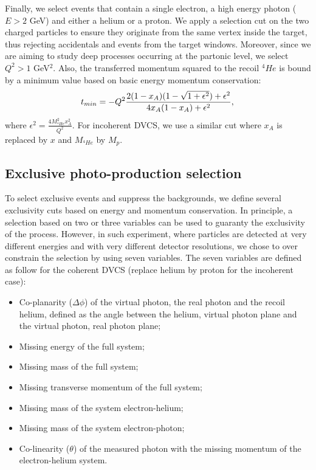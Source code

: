 \documentclass[aps,prc,preprint,superscriptaddress]{revtex4}
\begin{document}
Finally, we select events that contain a single electron, a high energy photon ($E>2$ GeV) and
either a helium or a proton. We apply a selection cut on the two charged particles 
to ensure they originate from the same vertex inside the target, thus rejecting accidentals and
events from the target windows.
Moreover, since we are aiming to study deep processes occurring at the partonic level, we select
$Q^2>1$ GeV$^2$. Also, the transferred momentum squared to the recoil $^{4}He$ is bound by
   a minimum value based on basic energy momentum conservation:
\begin{equation}
   t_{min} = - Q^{2} \frac{2(1- x_{A})(1 - \sqrt{1 + \epsilon ^{2}}) + \epsilon 
   ^{2}}{4 x_{A}(1-x_{A})+ \epsilon ^{2}},\\
\end{equation}
where $\epsilon ^{2} = \frac{4M^{2}_{^4\!He}x^{2}_{A}}{Q^{2}}$. For incoherent DVCS, 
we use a similar cut where $x_A$ is replaced by $x$ and $M_{^4\!He}$ by $M_{p}$. 

\subsection{Exclusive photo-production selection}

To select exclusive events and suppress the backgrounds, we define several 
exclusivity cuts based on energy and momentum conservation. In principle, 
a selection based on two or three variables can be used to guaranty the 
exclusivity of the process. However, in such experiment, where particles 
are detected at very different energies and with very different detector 
resolutions, we chose to over constrain the selection by using seven 
variables. The seven variables are defined as follow for the coherent 
DVCS (replace helium by proton for the incoherent case):
\begin{itemize}
	\item Co-planarity ($\Delta \phi$) of the virtual photon, the real photon and
		the recoil helium, defined as the angle between the helium, virtual photon
		plane and the virtual photon, real photon plane;
	\item Missing energy of the full system;
	\item Missing mass of the full system;
	\item Missing transverse momentum of the full system;
	\item Missing mass of the system electron-helium;
	\item Missing mass of the system electron-photon;
	\item Co-linearity ($\theta$) of the measured photon with the missing momentum of the 
		electron-helium system.
\end{itemize}
\end{document}
